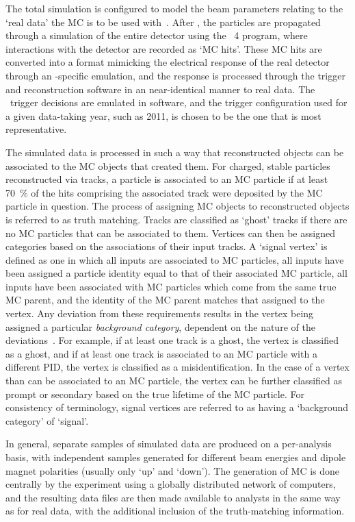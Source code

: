 The total simulation is configured to model the beam parameters relating to the 
`real data' the \ac{MC} is to be used with~\cite{Belyaev:1322400}.
After \evtgen, the particles are propagated through a simulation of the entire 
detector using the \geant\ 4 program, where interactions with the detector are 
recorded as `\ac{MC} hits'.
These \ac{MC} hits are converted into a format mimicking the electrical 
response of the real detector through an \lhcb-specific emulation, and the 
response is processed through the trigger and reconstruction software in an 
near-identical manner to real data.
The \lzero\ trigger decisions are emulated in software, and the trigger 
configuration used for a given data-taking year, such as 2011, is chosen to be 
the one that is most representative.

The simulated data is processed in such a way that reconstructed objects can be 
associated to the \ac{MC} objects that created them.
For charged, stable particles reconstructed via tracks, a particle is 
associated to an \ac{MC} particle if at least \SI{70}{\percent} of the hits 
comprising the associated track were deposited by the \ac{MC} particle in 
question.
The process of assigning \ac{MC} objects to reconstructed objects is referred 
to as truth matching.
Tracks are classified as `ghost' tracks if there are no \ac{MC} particles that 
can be associated to them.
Vertices can then be assigned categories based on the associations of their 
input tracks.
A `signal vertex' is defined as one in which all inputs are associated to 
\ac{MC} particles, all inputs have been assigned a particle identity equal to 
that of their associated \ac{MC} particle, all inputs have been associated with 
\ac{MC} particles which come from the same true \ac{MC} parent, and the 
identity of the \ac{MC} parent matches that assigned to the vertex.
Any deviation from these requirements results in the vertex being assigned a 
particular \emph{background category}, dependent on the nature of the 
deviations~\cite{Gligorov:1035682}.
For example, if at least one track is a ghost, the vertex is classified as a 
ghost, and if at least one track is associated to an \ac{MC} particle with a 
different \ac{PID}, the vertex is classified as a misidentification.
In the case of a vertex than can be associated to an \ac{MC} particle, the 
vertex can be further classified as prompt or secondary based on the true 
lifetime of the \ac{MC} particle.
For consistency of terminology, signal vertices are referred to as having a 
`background category' of `signal'.

In general, separate samples of simulated data are produced on a per-analysis 
basis, with independent samples generated for different beam energies and 
dipole magnet polarities (usually only `up' and `down').
The generation of \ac{MC} is done centrally by the experiment using a globally 
distributed network of computers, and the resulting data files are then made 
available to analysts in the same way as for real data, with the additional 
inclusion of the truth-matching information.
